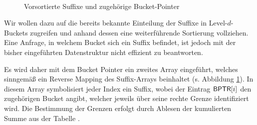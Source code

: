 \begin{figure}
	\vspace{-1em}
	\\
	\caption[Vorsortierte Suffixe und zugehörige Bucket-Pointer]{Vorsortierte Suffixe und zugehörige Bucket-Pointer}
	\label{fig:bucket_pointer_initial}
\end{figure}
Wir wollen dazu auf die bereits bekannte Einteilung der Suffixe in Level-\(d\)-Buckets zugreifen und anhand dessen eine weiterführende Sortierung vollziehen. Eine Anfrage, in welchem Bucket sich ein Suffix befindet, ist jedoch mit der bisher eingeführten Datenstruktur nicht effizient zu beantworten. \par
Es wird daher mit dem Bucket Pointer \bptr ein zweites Array eingeführt, welches sinngemäß ein Reverse Mapping des Suffix-Arrays \sa beinhaltet (s. Abbildung \ref{fig:bucket_pointer_initial}). In diesem Array symbolisiert jeder Index ein Suffix, wobei der Eintrag \(\bptr[i]\) den zugehörigen Bucket angibt, welcher jeweils über seine rechte Grenze identifiziert wird. Die Bestimmung der Grenzen erfolgt durch Ablesen der kumulierten Summe aus der Tabelle \bkt.
